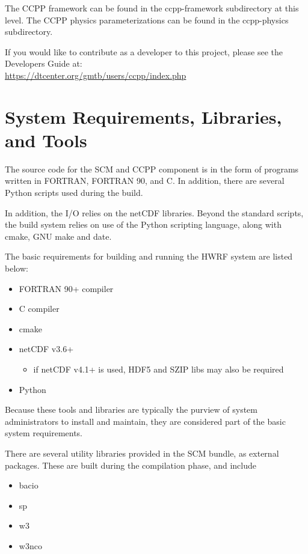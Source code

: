 The CCPP framework can be found in the ccpp-framework subdirectory at this level.  The CCPP physics parameterizations can be found in the ccpp-physics subdirectory.

If you would like to contribute as a developer to this project, please see the Developers Guide at:\\

\url{https://dtcenter.org/gmtb/users/ccpp/index.php}


\section{System Requirements, Libraries, and Tools}
\label{section: systemrequirements}

The source code for the SCM and CCPP component is in the form
of programs written in FORTRAN, FORTRAN 90, and C. In addition, there
are several Python scripts used during the build. 

In addition, the I/O relies on the netCDF
libraries. Beyond the standard scripts, the build system relies
on use of the Python scripting language, along with cmake, GNU make and date.

The basic requirements for building and running the HWRF system are
listed below:


\begin{itemize}
	\item FORTRAN 90+ compiler
	\item C compiler
	\item cmake 
	\item netCDF v3.6+
        \begin{itemize}
	\item if netCDF v4.1+ is used, HDF5 and SZIP libs may also be required
\end{itemize}
	\item Python
\end{itemize}


Because these tools and libraries are typically the purview of
system administrators to install and maintain, they are considered 
part of the basic system requirements.


There are several utility libraries provided in the SCM bundle, as external packages.  These
are built during the compilation phase, and include


\begin{itemize}
	\item bacio
	\item sp
	\item w3
	\item w3nco
\end{itemize}



